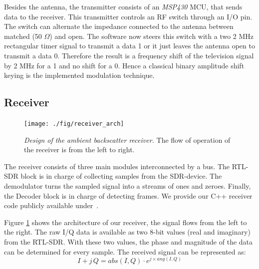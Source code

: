 \documentclass[conference]{IEEEtran}
\begin{document}
Besides the antenna, the transmitter consists of an \textit{MSP430} MCU,
that sends data to the receiver. This transmitter controls an RF switch
through an I/O pin. The switch can alternate the impedance connected to
the antenna between matched (50 \ensuremath{\Omega}) and open. The
software now steers this switch with a two 2 MHz rectangular timer
signal to transmit a data 1 or it just leaves the antenna open to
transmit a data 0. Therefore the result is a frequency shift of the
television signal by 2 MHz for a 1 and no shift for a 0. Hence a classical
binary amplitude shift keying is the implemented modulation technique.   
 
\subsection{Receiver}
\begin{figure}[h]
\centering
\texttt{[image: ./fig/receiver\_arch]}
\vspace{-6mm}
\caption{\emph{Design of the ambient backscatter receiver.} The flow of operation of the
receiver is from the left to right.}
\label{fig:receiver_arch}
\vspace{-6mm}
\end{figure}
The receiver consists of three main modules interconnected by a bus. The
RTL-SDR block is in charge of collecting samples from the SDR-device. The
demodulator turns the sampled signal into a streams of ones and zeroes.
Finally, the Decoder block is in charge of detecting frames. We provide our C++
receiver code publicly available under~\cite{s3xm3x_backscatterBASKReceiver}.

Figure \ref{fig:receiver_arch} shows the architecture of our receiver, the
signal flows from the left to the right.
The raw I/Q data is available as two 8-bit values (real and imaginary) from the
RTL-SDR. With these two values, the phase and magnitude of the data can be
determined for every sample. The received signal can be represented as:
\begin{equation}
	I+j\,Q = abs(I,Q) \cdot e^{j \times ang(I,Q)} 
\end{equation} 
 
\end{document}
